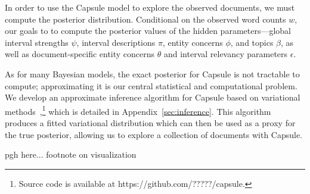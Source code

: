 In order to use the Capsule model to explore the observed documents, we must compute the posterior distribution.  Conditional on the observed word counts $w$, our goals to to compute the posterior values of the hidden parameters---global interval strengths $\psi$, interval descriptions $\pi$, entity concerns $\phi$, and topics $\beta$, as well as document-specific entity concerns $\theta$ and interval relevancy parameters $\epsilon$.

As for many Bayesian models, the exact posterior for Capsule is not tractable to compute; approximating it is our central statistical and computational problem.  We develop an approximate inference algorithm for Capsule based on variational methods~\cite{Wainwright:2008},\footnote{Source code is available at https://github.com/?????/capsule.} which is detailed in Appendix~\ref{sec:inference}. This algorithm produces a fitted variational distribution which can then be used as a proxy for the true posterior, allowing us to explore a collection of documents with Capsule.  

 pgh here...
footnote on visualization





